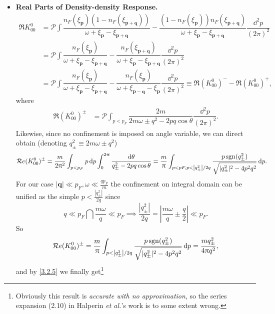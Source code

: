 \documentclass[bachelor,english,numbers]{ustcthesis}
\begin{document}
		\begin{itemize}
			\item {\bf Real Parts of Density-density Response.}
				\begin{align}
					\Re K^0_{00}&=\mathcal{P}\int\dfrac{n_F(\xi_{\bm{p}})(1-n_F(\xi_{\bm{p+q}}))}{\omega+\xi_{\bm{p}}-\xi_{\bm{p+q}}}-\dfrac{(1-n_F(\xi_{\bm{p}}))n_F(\xi_{\bm{p+q}})}{\omega+\xi_{\bm{p}}-\xi_{\bm{p+q}}}\dfrac{\dd^2 p}{(2\pi)^2}\nonumber\\
					&=\mathcal{P}\int\dfrac{n_F(\xi_{\bm{p}})}{\omega+\xi_{\bm{p}}-\xi_{\bm{p+q}}}-\dfrac{n_F(\xi_{\bm{p+q}})}{\omega+\xi_{\bm{p}}-\xi_{\bm{p+q}}}\dfrac{\dd^2 p}{(2\pi)^2}\nonumber\\
					&=\mathcal{P}\int\dfrac{n_F(\xi_{\bm{p}})}{\omega+\xi_{\bm{p}}-\xi_{\bm{p+q}}}-\dfrac{n_F(\xi_{\bm{p}})}{\omega+\xi_{\bm{p-q}}-\xi_{\bm{p}}}\dfrac{\dd^2 p}{(2\pi)^2}\equiv\Re (K^0_{00})^{-}-\Re(K^0_{00})^+,\label{3.2.5}
				\end{align}
				where
				\begin{align*}
					\Re (K^0_{00})^{\pm}&=\mathcal{P}\int_{p<p_F}\dfrac{2m}{2m\omega\pm q^2-2pq\cos\theta}\dfrac{\dd^2p}{(2\pi)^2}.
				\end{align*}
				Likewise, since no confinement is imposed on angle variable, we can direct obtain (denoting $q^2_{\pm}\equiv 2m\omega\pm q^2$)
				\begin{equation*}
					\mathop{\mathcal{R}e} (K^0_{00})^{\pm}=\dfrac{m}{2\uppi^2}\int_{p<p_F}p\mathop{}\!\mathrm{d} p\int_0^{2\uppi}\dfrac{\mathop{}\!\mathrm{d}\theta}{q^2_\pm-2p q\cos\theta}=\dfrac{m}{\uppi}\int_{p<pF, p<\left|q_{\pm}^2\right|/2q}\dfrac{p\mathop{\rm sgn}(q_{\pm}^2)}{\sqrt{|q_{\pm}^2|^2-4p^2q^2}}\mathop{}\!\mathrm{d} p.
				\end{equation*}
				For our case $|\bm{q}|\ll p_F, \omega\ll\frac{q p_F}{m}$ the confinement on integral domain can be unified as the simple $p<\frac{|q_{\pm}^2|}{2q}$ since
				\begin{equation*}
					q\ll p_F\bigcap\dfrac{m\omega}{q}\ll p_F\implies\dfrac{|q_{\pm}^2|}{2q}=\left|\dfrac{m\omega}{q}\pm\dfrac{q}{2}\right|\ll p_F.
				\end{equation*}
				So
				\begin{equation}\label{3.2.6}
					\mathop{\mathcal{R}e} (K^0_{00})^{\pm}=\dfrac{m}{\uppi}\int_{p<\left|q_{\pm}^2\right|/2q}\dfrac{p\mathop{\rm sgn}(q_{\pm}^2)}{\sqrt{|q_{\pm}^2|^2-4p^2q^2}}\mathop{}\!\mathrm{d} p=\dfrac{mq_{\pm}^2}{4\uppi q^2},
				\end{equation}
				and by \eqref{3.2.5} we finally get\footnote{Obviously this result is \emph{accurate with no approximation}, so the series expansion (2.10) in Halperin {\it et al.}'s work is to some extent wrong.}

\end{itemize}
\end{document}
